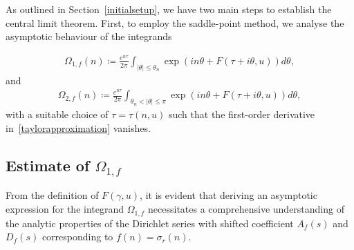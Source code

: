 \documentclass[12pt, oneside,reqno]{amsart}
\numberwithin{equation}{section}
\begin{document}
As outlined in Section~\ref{initialsetup}, we have two main steps to establish the central limit theorem. First, to employ the saddle-point method, we analyse the asymptotic behaviour of the integrands

\begin{align}\label{maintermintegral}
\Omega_{1,f}(n)
\coloneqq\frac{e^{n\tau}}{2\pi}\int_{|\theta|\leq \theta_n}\exp(in\theta+F(\tau+i\theta,u))d\theta,
\end{align}
and
\begin{align}\label{errortermintegral}
\Omega_{2,f}(n)
\coloneqq\frac{e^{n\tau}}{2\pi}\int_{\theta_n<|\theta|\leq \pi}\exp(in\theta+F(\tau+i\theta,u))d\theta,
\end{align}
with a suitable choice of $\tau=\tau(n,u)$ such that the first-order derivative in~\eqref{taylorapproximation} vanishes.


\subsection{Estimate of $\Omega_{1,f}$}\label{EstimateofOmega1f}
From the definition of $F(\gamma,u)$,  it is evident that deriving an asymptotic expression for the integrand $\Omega_{1,f}$ necessitates a comprehensive understanding of the analytic properties of the Dirichlet series with shifted coefficient $A_f(s)$ and $D_f(s)$ corresponding to $f(n)=\sigma_r(n)$.
\end{document}
